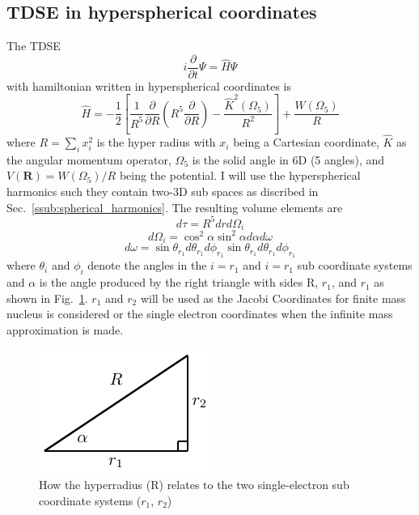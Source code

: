 \subsection{TDSE in hyperspherical coordinates} %
\label{sub:tdse_in_hyperspherical_coordinates}
The TDSE
\begin{equation}
    i\frac{\partial}{\partial t}\Psi = \hat{H}\Psi
\end{equation}
with hamiltonian written in hyperspherical coordinates is
\begin{equation}
   \hat{H} = -\frac{1}{2} \left[\frac{1}{R^5}\frac{\partial}{\partial R}\left(R^5\frac{\partial}{\partial R}\right) - \frac{\hat{K}^2(\Omega_5)}{R^2}\right] + \frac{W(\Omega_5)}{R}
\end{equation}
where $R=\sum_i x_i^2$ is the hyper radius with $x_i$ being a Cartesian coordinate, $\hat{K}$ as the angular momentum operator, $\Omega_5$ is the solid angle in 6D (5 angles), and $V(\mathbf{R}) = W(\Omega_5)/R$ being the potential. I will use the hyperspherical harmonics such they contain two-3D sub spaces as discribed in Sec.~\ref{ssub:spherical_harmonics}. 
The resulting volume elements are 
\begin{equation}
    d\tau = R^5 dr d\Omega_i
\end{equation}
\begin{equation}
    d\Omega_i = \cos^2\alpha \sin^2\alpha d\alpha d\omega
\end{equation}
\begin{equation}
    d\omega = \sin\theta_{r_1} d\theta_{r_1} d\phi_{r_1} \sin\theta_{r_1} d\theta_{r_1} d\phi_{r_1}
\end{equation}
where $\theta_i$ and $\phi_i$ denote the angles in the $i={r_1}$ and $i={r_1}$ sub coordinate systems and $\alpha$ is the angle produced by the right triangle with sides R, ${r_1}$, and ${r_1}$ as shown in Fig.~\ref{fig:hyperradius}. $r_1$ and $r_2$ will be used as the Jacobi Coordinates for finite mass nucleus is considered or the single electron coordinates when the infinite mass approximation is made.
\begin{figure}[h!]
\centering
\includegraphics[width=0.3\linewidth]{figs/Two_electron/hyperradius.pdf}
\caption{How the hyperradius (R) relates to the two single-electron sub coordinate systems ($r_1$, $r_2$)} 
  \label{fig:hyperradius}
\end{figure}

